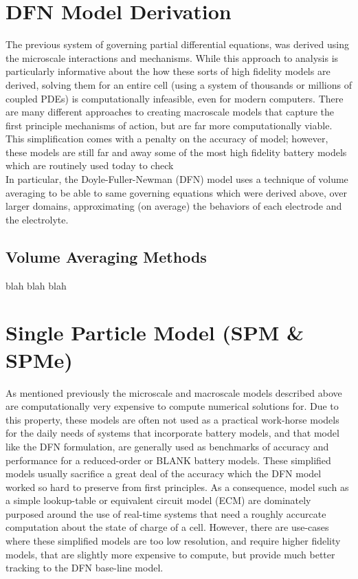 \documentclass[lettersize,journal]{IEEEtran}
\begin{document}
\section{DFN Model Derivation}

The previous system of governing partial differential equations, was derived using the microscale interactions and mechanisms. While this approach to analysis is particularly informative about the how these sorts of high fidelity models are derived, solving them for an entire cell (using a system of thousands or millions of coupled PDEs) is computationally infeasible, even for modern computers. There are many different approaches to creating macroscale models that capture the first principle mechanisms of action, but are far more computationally viable. This simplification comes with a penalty on the accuracy of model; however, these models are still far and away some of the most high fidelity battery models which are routinely used today to check  \\

In particular, the Doyle-Fuller-Newman (DFN) model uses a technique of volume averaging to be able to same governing equations which were derived above, over larger domains, approximating (on average) the behaviors of each electrode and the electrolyte. \\

\subsection{Volume Averaging Methods}

blah blah blah

\section{Single Particle Model (SPM \& SPMe)}

As mentioned previously the microscale and macroscale models described above are computationally very expensive to compute numerical solutions for. Due to this property, these models are often not used as a practical work-horse models for the daily needs of systems that incorporate battery models, and that model like the DFN formulation, are generally used as benchmarks of accuracy and performance for a reduced-order or BLANK battery models. These simplified models usually sacrifice a great deal of the accuracy which the DFN model worked so hard to preserve from first principles. As a consequence, model such as a simple lookup-table or equivalent circuit model (ECM) are dominately purposed around the use of real-time systems that need a roughly accurcate computation about the state of charge of a cell. However, there are use-cases where these simplified models are too low resolution, and require higher fidelity models, that are slightly more expensive to compute, but provide much better tracking to the DFN base-line model. \\
\end{document}
